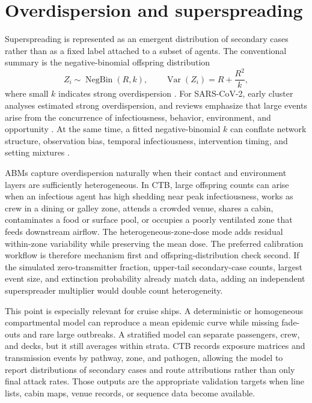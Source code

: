 \section{Overdispersion and superspreading}
Superspreading is represented as an emergent distribution of secondary cases rather than as a fixed label attached to a subset of agents. The conventional summary is the negative-binomial
offspring distribution
\begin{equation}
Z_i\sim\operatorname{NegBin}(R,k),\qquad
\operatorname{Var}(Z_i)=R+\frac{R^2}{k},
\end{equation}
where small $k$ indicates strong overdispersion \citep{LloydSmith2005,Endo2020Overdispersion}. For SARS-CoV-2, early cluster analyses estimated strong overdispersion, and reviews emphasize
that large events arise from the concurrence of infectiousness, behavior, environment, and opportunity \citep{Althouse2020Superspreading}. At the same time, a fitted negative-binomial $k$
can conflate network structure, observation bias, temporal infectiousness, intervention timing, and setting mixtures \citep{Zhao2022NegativeBinomial}.

ABMs capture overdispersion naturally when their contact and environment layers are sufficiently heterogeneous. In CTB, large offspring counts can arise when an infectious agent has high
shedding near peak infectiousness, works as crew in a dining or galley zone, attends a crowded venue, shares a cabin, contaminates a food or surface pool, or occupies a poorly ventilated
zone that feeds downstream airflow. The heterogeneous-zone-dose mode adds residual within-zone variability while preserving the mean dose. The preferred calibration workflow is therefore
mechanism first and offspring-distribution check second. If the simulated zero-transmitter fraction, upper-tail secondary-case counts, largest event size, and extinction probability already
match data, adding an independent superspreader multiplier would double count heterogeneity.

This point is especially relevant for cruise ships. A deterministic or homogeneous compartmental model can reproduce a mean epidemic curve while missing fade-outs and rare large outbreaks. A
stratified model can separate passengers, crew, and decks, but it still averages within strata. CTB records exposure matrices and transmission events by pathway, zone, and pathogen, allowing
the model to report distributions of secondary cases and route attributions rather than only final attack rates. Those outputs are the appropriate validation targets when line lists, cabin
maps, venue records, or sequence data become available.

